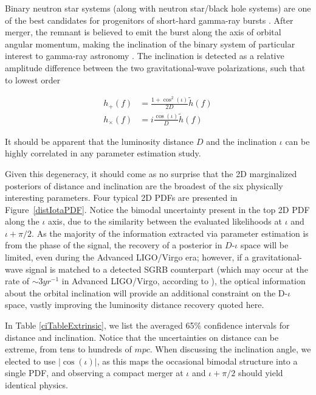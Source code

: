 \documentclass[11pt,a4paper]{emulateapj} 
\newcommand{\carl}[1]{{\color{red} #1}}
\begin{document}
Binary neutron star systems (along with neutron star/black hole
systems) are one of the best candidates for progenitors of short-hard
gamma-ray bursts \citep[and references therein]{Nakar2007}.  After
merger, the remnant is believed to emit the burst along the axis of
orbital angular momentum, making the inclination of the binary system
of particular interest to gamma-ray astronomy
\citep{LSCGRB2010,Corsi2012}.  The inclination is detected as a
relative amplitude difference between the two gravitational-wave
polarizations, such that to lowest order

\begin{align}
h_+(f) &= \frac{1+\cos^2(\iota)}{2 D} \tilde{h}(f) \nonumber
\\ h_\times(f) &= i \frac{\cos(\iota)}{D}\tilde{h}(f)
\end{align}

\noindent It should be apparent that the luminosity distance $D$ and
the inclination $\iota$ can be highly correlated in any parameter
estimation study.

Given this degeneracy, it should come as no surprise that the 2D
marginalized posteriors of distance and inclination are the broadest
of the six physically interesting parameters.  Four typical 2D PDFs
are presented in Figure~\ref{distIotaPDF}.  Notice the bimodal
uncertainty present in the top 2D PDF along the $\iota$ axis, due to
the similarity between the evaluated likelihoods at $\iota$ and $\iota
+ \pi/2$.  As the majority of the information extracted via parameter
estimation is from the phase of the signal, the recovery of a
posterior in $D$-$\iota$ space will be limited, even during the
Advanced LIGO/Virgo era; however, if a gravitational-wave signal is
matched to a detected SGRB counterpart (which may occur at the rate of
$\sim 3 yr^{-1}$ in Advanced LIGO/Virgo, according to
\cite{Metzger2013}), the optical information about the orbital
inclination will provide an additional constraint on the D-$\iota$
space, vastly improving the luminosity distance recovery quoted here.
 
 
In Table \ref{ciTableExtrinsic}, we list the averaged 65\% confidence
intervals for distance and inclination.  Notice that the uncertainties
on distance can be extreme, from tens to hundreds of $mpc$.  When
discussing the inclination angle, we elected to use $|\cos(\iota)|$,
as this maps the occasional bimodal structure into a single PDF, and
observing a compact merger at $\iota$ and $\iota + \pi/2$ should yield
identical physics.
\end{document}
